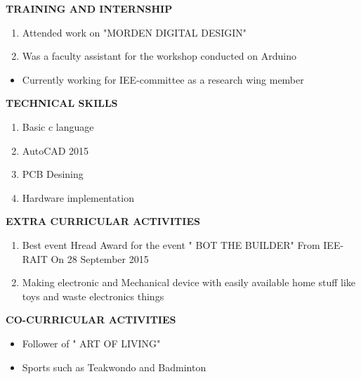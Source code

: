 \documentclass[a4paper]{article}
\begin{document}
\begin{flushleft}
\textbf {TRAINING AND INTERNSHIP}\\
\begin{enumerate}
\item Attended work on "MORDEN DIGITAL DESIGIN" 
\item Was a faculty assistant for the workshop conducted on Arduino
\end{enumerate}
\end{flushleft}


\begin{flushleft}
\textbf {}
\begin{itemize}
\item Currently working for IEE-committee as a research wing member
\end{itemize}
\end{flushleft}

\begin{flushleft}
\textbf {TECHNICAL SKILLS}\\
\begin{enumerate}
\item Basic c language
\item AutoCAD 2015
\item PCB Desining
\item Hardware implementation
\end{enumerate}
\end{flushleft}



\begin{flushleft}
\textbf {EXTRA CURRICULAR ACTIVITIES}\\
\begin{enumerate}
\item Best event Hread Award for the event " BOT THE BUILDER"  From IEE-RAIT On 28 September 2015
\item Making electronic and Mechanical device with easily available home stuff like toys and waste electronics things
\end{enumerate}
\end{flushleft}


\begin{flushleft}
\textbf {CO-CURRICULAR ACTIVITIES}\\
\begin{itemize}
\item Follower of " ART OF LIVING"
\item Sports such as Teakwondo and Badminton
\end{itemize}
\end{flushleft}
\end{document}
